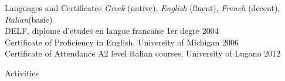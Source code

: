 \documentclass{resume}
\begin{document}
\begin{rSection}{Languages and Certificates}
  \textit{Greek} (native), \textit{English} (fluent), \textit{French} (decent), \textit{Italian}(basic) \\
  DELF, diplome d'etudes en langue francaise 1er degre
  \hfill 2004 \\
  Certificate of Proficiency in English, University of Michigan
  \hfill 2006 \\
  Certificate of Attendance A2 level italian courses, University of Lugano
  \hfill 2012
\end{rSection}
\begin{rSection}{Activities}
\end{rSection}
\end{document}
